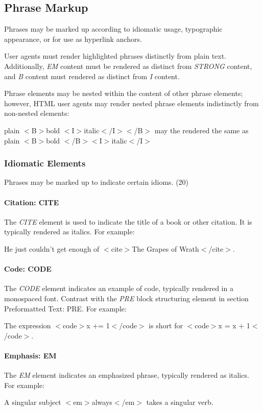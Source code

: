 \subsection*{Phrase Markup}\par 
Phrases may be marked up according to idiomatic usage,
typographic appearance, or for use as hyperlink anchors.
\par \par 
User agents must render highlighted phrases distinctly from plain
text.  Additionally, {\it EM} content must be rendered as distinct from
{\it STRONG} content, and {\it B} content must rendered as distinct
from {\it I} content.
\par \par 
Phrase elements may be nested within the content of other phrase
elements;  however, HTML user agents may render nested phrase
elements indistinctly from non-nested elements:
\par plain $<$B$>$bold $<$I$>$italic$<$/I$>$$<$/B$>$ may the rendered 
the same as plain $<$B$>$bold $<$/B$>$$<$I$>$italic$<$/I$>$
\subsubsection*{Idiomatic Elements}\par 
Phrases may be marked up to indicate certain idioms.
(20)\par \paragraph*{Citation:  CITE}\par 
The {\it CITE} element is used to indicate the title of a book or
other citation.  It is typically rendered as italics.  For example:
\par He just couldn't get enough of $<$cite$>$The Grapes of Wrath$<$/cite$>$.
\paragraph*{Code:  CODE}\par 
The {\it CODE} element indicates an example of code, typically
rendered in a monospaced font.  Contrast with the {\it PRE} block
structuring element in section Preformatted Text:  PRE.  For example:
\par The expression $<$code$>$x += 1$<$/code$>$
is short for $<$code$>$x = x + 1$<$/code$>$.
\paragraph*{Emphasis:  EM}\par 
The {\it EM} element indicates an emphasized phrase, typically
rendered as italics.  For example:
\par A singular subject $<$em$>$always$<$/em$>$ takes a singular verb.
